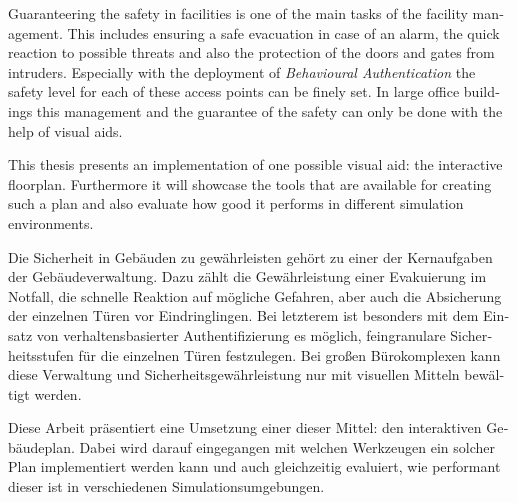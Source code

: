 
\null\vfil
\begin{otherlanguage}{english}
\begin{center}\textsf{\textbf{\abstractname}}\end{center}

\noindent Guaranteering the safety in facilities is one of the main tasks of the facility management. This includes ensuring a safe evacuation in case of an alarm, the quick reaction to possible threats and also the protection of the doors and gates from intruders. Especially with the deployment of \emph{Behavioural Authentication} the safety level for each of these access points can be finely set. In large office buildings this management and the guarantee of the safety can only be done with the help of visual aids.

This thesis presents an implementation of one possible visual aid: the interactive floorplan. Furthermore it will showcase the tools that are available for creating such a plan and also evaluate how good it performs in different simulation environments.

\end{otherlanguage}
\vfil\null



\null\vfil
\begin{otherlanguage}{ngerman}
\begin{center}\textsf{\textbf{\abstractname}}\end{center}

\noindent Die Sicherheit in Gebäuden zu gewährleisten gehört zu einer der Kernaufgaben der Gebäudeverwaltung. Dazu zählt die Gewährleistung einer Evakuierung im Notfall, die schnelle Reaktion auf mögliche Gefahren, aber auch die Absicherung der einzelnen Türen vor Eindringlingen. Bei letzterem ist besonders mit dem Einsatz von verhaltensbasierter Authentifizierung es möglich, feingranulare Sicherheitsstufen für die einzelnen Türen festzulegen. Bei großen Bürokomplexen kann diese Verwaltung und Sicherheitsgewährleistung nur mit visuellen Mitteln bewältigt werden. 

Diese Arbeit präsentiert eine Umsetzung einer dieser Mittel: den interaktiven Gebäudeplan. Dabei wird darauf eingegangen mit welchen Werkzeugen ein solcher Plan implementiert werden kann und auch gleichzeitig evaluiert, wie performant dieser ist in  verschiedenen Simulationsumgebungen.

\end{otherlanguage}
\vfil\null



